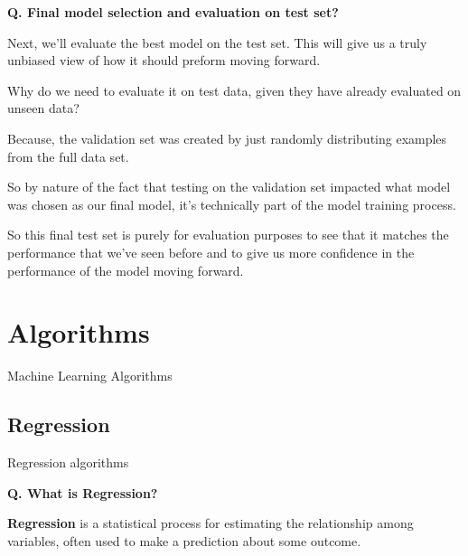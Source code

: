 \begin{frame}[fragile]{\textbf{Q. Final model selection and evaluation on test set?}}
  \begin{wideitemize}\small
    \item Next, we'll evaluate the best model on the test set. This will give us
    a truly unbiased view of how it should preform moving forward.
    \item Why do we need to evaluate it on test data, given they have already evaluated on unseen data?
    \begin{wideitemize}
      \item Because, the validation set was created by just randomly distributing examples from
      the full data set.
      \item So by nature of the fact that testing on the validation set impacted what model
      was chosen as our final model, it's technically part of the model training process.
      \item So this final test set is purely for evaluation purposes to see that it matches
      the performance that we've seen before and to give us more confidence in the performance
      of the model moving forward.
    \end{wideitemize}
  \end{wideitemize}
\end{frame}

\section{Algorithms}
\begin{transitionframe}
  \begin{center}
    \Huge Machine Learning Algorithms
  \end{center}
\end{transitionframe}

\subsection{Regression}
\begin{transitionsubframe}
  \begin{center}
    \Huge Regression algorithms
  \end{center}
\end{transitionsubframe}

\begin{frame}[fragile]{\textbf{Q. What is Regression?}}
  \begin{wideitemize}
  \item \textbf{Regression} is a statistical process for estimating
  the relationship among variables, often used to make a prediction about
  some outcome.
  \end{wideitemize}
\end{frame}


